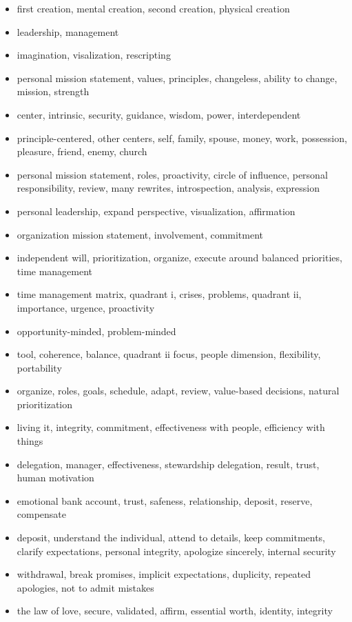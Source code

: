 \documentclass[11pt]{article}
\begin{document}
\begin{itemize}
\item first creation, mental creation, second creation, physical creation
\item leadership, management
\item imagination, visalization, rescripting
\item personal mission statement, values, principles, changeless, ability to change, mission, strength
\item center, intrinsic, security, guidance, wisdom, power, interdependent
\item principle-centered, other centers, self, family, spouse, money, work, possession, pleasure, friend, enemy, church
\item personal mission statement, roles, proactivity, circle of influence, personal responsibility, review, many rewrites, introspection, analysis, expression
\item personal leadership, expand perspective, visualization, affirmation
\item organization mission statement, involvement, commitment
\item independent will, prioritization, organize, execute around balanced priorities, time management
\item time management matrix, quadrant i, crises, problems, quadrant ii, importance, urgence, proactivity
\item opportunity-minded, problem-minded 
\item tool, coherence, balance, quadrant ii focus, people dimension, flexibility, portability
\item organize, roles, goals, schedule, adapt, review, value-based decisions, natural prioritization
\item living it, integrity, commitment, effectiveness with people, efficiency with things
\item delegation, manager, effectiveness, stewardship delegation, result,  trust, human motivation 
\item emotional bank account, trust, safeness, relationship, deposit, reserve, compensate
\item deposit, understand the individual, attend to details, keep commitments, clarify expectations, personal integrity, apologize sincerely, internal security
\item withdrawal, break promises, implicit expectations, duplicity, repeated apologies, not to admit mistakes
\item the law of love, secure, validated, affirm, essential worth, identity, integrity

\end{itemize}
\end{document}
